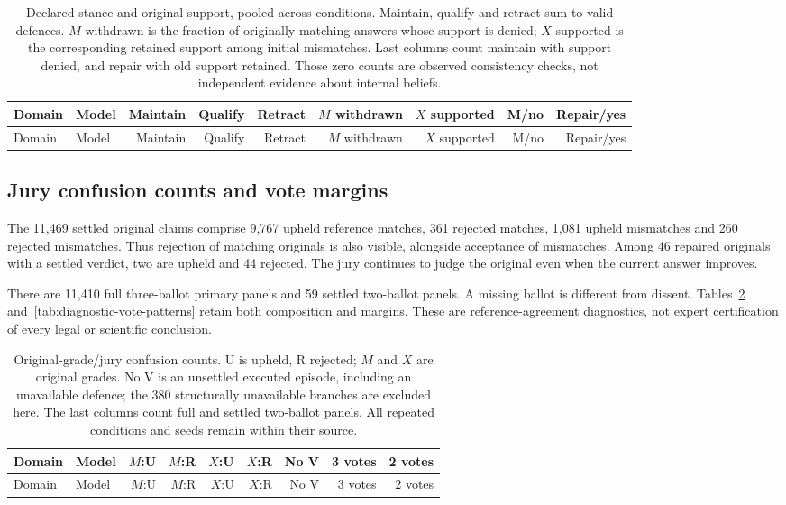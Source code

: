 \begingroup\small\setlength{\tabcolsep}{3pt}
\begin{longtable}{llrrrrrrr}
\caption{Declared stance and original support, pooled across conditions.
Maintain, qualify and retract sum to valid defences. $M$ withdrawn is the
fraction of originally matching answers whose support is denied; $X$ supported
is the corresponding retained support among initial mismatches. Last columns
count maintain with support denied, and repair with old support retained.
Those zero counts are observed consistency checks, not independent evidence
about internal beliefs.}
\label{tab:diagnostic-support}\\
\toprule Domain & Model & Maintain & Qualify & Retract & $M$ withdrawn & $X$ supported & M/no & Repair/yes\\\midrule\endfirsthead
\toprule Domain & Model & Maintain & Qualify & Retract & $M$ withdrawn & $X$ supported & M/no & Repair/yes\\\midrule\endhead

\bottomrule\end{longtable}\endgroup

\subsection{Jury confusion counts and vote margins}
\label{app:diagnostic-jury}
The 11,469 settled original claims comprise 9,767 upheld reference matches,
361 rejected matches, 1,081 upheld mismatches and 260 rejected mismatches.
Thus rejection of matching originals is also visible, alongside acceptance
of mismatches. Among 46 repaired originals with a settled verdict, two are
upheld and 44 rejected. The jury continues to judge the original even when
the current answer improves.

There are 11,410 full three-ballot primary panels and 59 settled two-ballot
panels. A missing ballot is different from dissent. Tables~\ref{tab:diagnostic-jury}
and~\ref{tab:diagnostic-vote-patterns} retain both composition and margins.
These are reference-agreement diagnostics, not expert certification of every
legal or scientific conclusion.

\begingroup\small\setlength{\tabcolsep}{3pt}
\begin{longtable}{llrrrrrrr}
\caption{Original-grade/jury confusion counts. U is upheld, R rejected;
$M$ and $X$ are original grades. No V is an unsettled executed episode,
including an unavailable defence; the 380 structurally unavailable branches
are excluded here. The last columns count full and settled two-ballot panels.
All repeated conditions and seeds remain within their source.}
\label{tab:diagnostic-jury}\\
\toprule Domain & Model & $M$:U & $M$:R & $X$:U & $X$:R & No V & 3 votes & 2 votes\\\midrule\endfirsthead
\toprule Domain & Model & $M$:U & $M$:R & $X$:U & $X$:R & No V & 3 votes & 2 votes\\\midrule\endhead

\bottomrule\end{longtable}\endgroup

